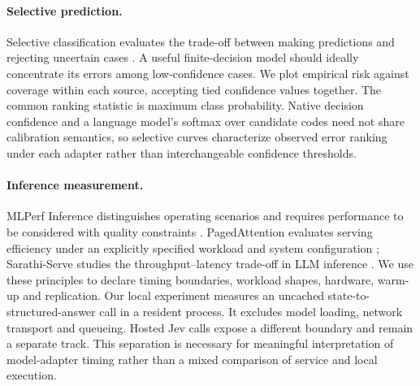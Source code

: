 \paragraph{Selective prediction.}
Selective classification evaluates the trade-off between making predictions and rejecting uncertain cases \citep{selective}. A useful finite-decision model should ideally concentrate its errors among low-confidence cases. We plot empirical risk against coverage within each source, accepting tied confidence values together. The common ranking statistic is maximum class probability. Native decision confidence and a language model's softmax over candidate codes need not share calibration semantics, so selective curves characterize observed error ranking under each adapter rather than interchangeable confidence thresholds.

\paragraph{Inference measurement.}
MLPerf Inference distinguishes operating scenarios and requires performance to be considered with quality constraints \citep{mlperf}. PagedAttention evaluates serving efficiency under an explicitly specified workload and system configuration \citep{vllm}; Sarathi-Serve studies the throughput--latency trade-off in LLM inference \citep{sarathi}. We use these principles to declare timing boundaries, workload shapes, hardware, warm-up and replication. Our local experiment measures an uncached state-to-structured-answer call in a resident process. It excludes model loading, network transport and queueing. Hosted Jev calls expose a different boundary and remain a separate track. This separation is necessary for meaningful interpretation of model-adapter timing rather than a mixed comparison of service and local execution.
